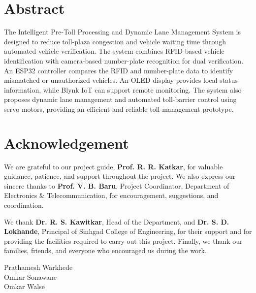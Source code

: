 \documentclass[12pt,a4paper]{report}
\newcommand{\StudentOne}{Prathamesh Warkhede}
\newcommand{\StudentTwo}{Omkar Sonawane}
\newcommand{\StudentThree}{Omkar Walse}
\newcommand{\GuideName}{Prof. R. R. Katkar}
\newcommand{\CoordinatorName}{Prof. V. B. Baru}
\newcommand{\HODName}{Dr. R. S. Kawitkar}
\newcommand{\PrincipalName}{Dr. S. D. Lokhande}
\newcommand{\CollegeName}{Sinhgad College of Engineering}
\begin{document}
\clearpage
{}
\tableofcontents
\clearpage
\listoffigures
{}
\clearpage

\chapter*{Abstract}
The Intelligent Pre-Toll Processing and Dynamic Lane Management System is designed
to reduce toll-plaza congestion and vehicle waiting time through automated vehicle
verification. The system combines RFID-based vehicle identification with camera-based
number-plate recognition for dual verification. An ESP32 controller compares the RFID
and number-plate data to identify mismatched or unauthorized vehicles. An OLED
display provides local status information, while Blynk IoT can support remote
monitoring. The system also proposes dynamic lane management and automated
toll-barrier control using servo motors, providing an efficient and reliable
toll-management prototype.

\chapter*{Acknowledgement}
We are grateful to our project guide, \textbf{\GuideName}, for valuable guidance,
patience, and support throughout the project. We also express our sincere thanks to
\textbf{\CoordinatorName}, Project Coordinator, Department of Electronics \&
Telecommunication, for encouragement, suggestions, and coordination.

We thank \textbf{\HODName}, Head of the Department, and
\textbf{\PrincipalName}, Principal of \CollegeName, for their support and for
providing the facilities required to carry out this project. Finally, we thank our
families, friends, and everyone who encouraged us during the work.

\vspace{0.8cm}
\begin{flushright}
\StudentOne\\
\StudentTwo\\
\StudentThree
\end{flushright}
\end{document}
